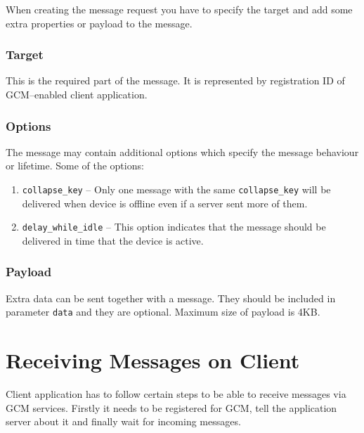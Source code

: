 When creating the message request you have to specify the target and add some extra properties or payload to the message.

\subsubsection{Target}\vspace{-0.5em}
This is the required part of the message. It is represented by registration ID of GCM--enabled client application.

\subsubsection{Options}\vspace{-0.5em}
The message may contain additional options which specify the message behaviour or lifetime. Some of the options:

\begin{enumerate}
	\item \verb!collapse_key! -- Only one message with the same \verb!collapse_key! will be delivered when device is offline even if a server sent more of them.
	\item \verb!delay_while_idle! -- This option indicates that the message should be delivered in time that the device is active.
\end{enumerate}


\subsubsection{Payload}\vspace{-0.5em}
Extra data can be sent together with a message. They should be included in parameter \texttt{data} and they are optional. Maximum size of payload is 4KB.








\section{Receiving Messages on Client}
\label{sec:gcm_receive}
Client application has to follow certain steps to be able to receive messages via GCM services. Firstly it needs to be registered for GCM, tell the application server about it and finally wait for incoming messages.

